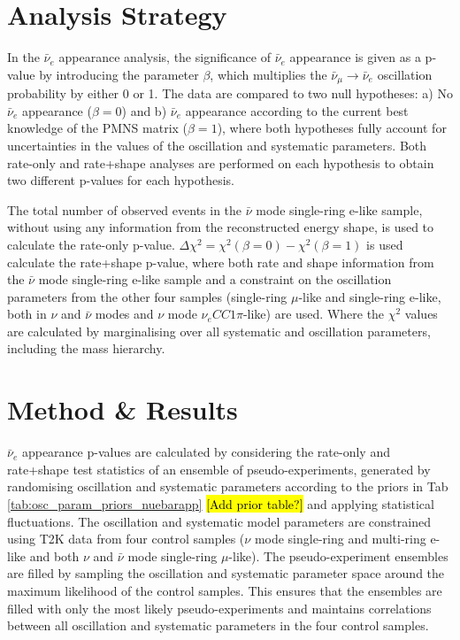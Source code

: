 \documentclass[]{article}
\newcommand{\nue}{\nu_{e}}
\newcommand{\nueb}{\bar{\nu}_{e}}
\newcommand{\numub}{\bar{\nu}_{\mu}}
\newcommand{\nub}{\bar{\nu}}
\begin{document}
\section{Analysis Strategy}

In the $\nueb$ appearance analysis, the significance of $\nueb$ appearance is given as a p-value by introducing the parameter $\beta$, which multiplies the $\numub \rightarrow \nueb$ oscillation probability by either 0 or 1. The data are compared to two null hypotheses: a) No $\nueb$ appearance ($\beta = 0$) and b) $\nueb$ appearance according to the current best knowledge of the PMNS matrix ($\beta = 1$), where both hypotheses fully account for uncertainties in the values of the oscillation and systematic parameters. Both rate-only and rate+shape analyses are performed on each hypothesis to obtain two different p-values for each hypothesis.

The total number of observed events in the $\nub$ mode single-ring e-like sample, without using any information from the reconstructed energy shape, is used to calculate the rate-only p-value. $\Delta \chi^2 = \chi^2 \left( \beta = 0 \right) - \chi^2 \left( \beta = 1 \right)$ is used calculate the rate+shape p-value, where both rate and shape information from the $\nub$ mode single-ring e-like sample and a constraint on the oscillation parameters from the other four samples (single-ring $\mu$-like and single-ring e-like, both in $\nu$ and $\nub$ modes and $\nu$ mode $\nue CC1\pi$-like) are used. Where the $\chi^2$ values are calculated by marginalising over all systematic and oscillation parameters, including the mass hierarchy.


\section{Method \& Results}

$\nueb$ appearance p-values are calculated by considering the rate-only and rate+shape test statistics of an ensemble of pseudo-experiments, generated by randomising oscillation and systematic parameters according to the priors in Tab \ref{tab:osc_param_priors_nuebarapp} \hl{[Add prior table?]} and applying statistical fluctuations. The oscillation and systematic model parameters are constrained using T2K data from four control samples ($\nu$ mode single-ring and multi-ring e-like and both $\nu$ and $\nub$ mode single-ring $\mu$-like). The pseudo-experiment ensembles are filled by sampling the oscillation and systematic parameter space around the maximum likelihood of the control samples. This ensures that the ensembles are filled with only the most likely pseudo-experiments and maintains correlations between all oscillation and systematic parameters in the four control samples.
\end{document}
